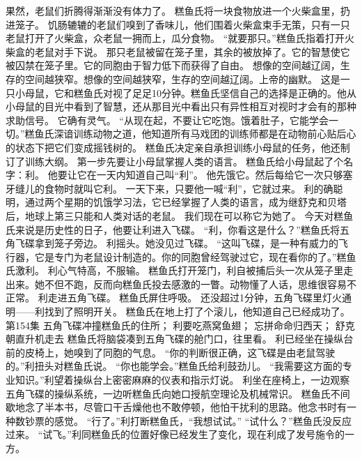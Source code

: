 \documentclass[a4paper,12pt,UTF8,twoside]{ctexbook}
\begin{document}
        果然，老鼠们折腾得渐渐没有体力了。 
        糕鱼氏将一块食物放进一个火柴盒里，扔进笼子。 
        饥肠辘辘的老鼠们嗅到了香味儿，他们围着火柴盒束手无策，只有一只老鼠打开了火柴盒，众老鼠一拥而上，瓜分食物。 
        “就要那只。”糕鱼氏指着打开火柴盒的老鼠对手下说。 
        那只老鼠被留在笼子里，其余的被放掉了。它的智慧使它被囚禁在笼子里。它的同胞由于智力低下而获得了自由。 
        想像的空间越辽阔，生存的空间越狭窄。想像的空间越狭窄，生存的空间越辽阔。上帝的幽默。 
        这是一只小母鼠，它和糕鱼氏对视了足足10分钟。糕鱼氏坚信自己的选择是正确的。他从小母鼠的目光中看到了智慧，还从那目光中看出只有异性相互对视时才会有的那种求助信号。 
        它确有灵气。 
        “从现在起，不要让它吃饱。饿着肚子，它能学会一切。”糕鱼氏深谙训练动物之道，他知道所有马戏团的训练师都是在动物前心贴后心的状态下把它们变成摇钱树的。 
        糕鱼氏决定亲自承担训练小母鼠的任务，他还制订了训练大纲。 
        第一步先要让小母鼠掌握人类的语言。 
        糕鱼氏给小母鼠起了个名字：利。 
        他要让它在一天内知道自己叫“利”。 
        他先饿它。然后每给它一次只够塞牙缝儿的食物时就叫它利。 
        一天下来，只要他一喊“利”，它就过来。 
        利的确聪明，通过两个星期的饥饿学习法，它已经掌握了人类的语言，成为继舒克和贝塔后，地球上第三只能和人类对话的老鼠。 
        我们现在可以称它为她了。 
        今天对糕鱼氏来说是历史性的日子，他要让利进入飞碟。 
        “利，你看这是什么？”糕鱼氏将五角飞碟拿到笼子旁边。 
        利摇头。她没见过飞碟。 
        “这叫飞碟，是一种有威力的飞行器，它是专门为老鼠设计制造的。你的同胞曾经驾驶过它，现在看你的了。”糕鱼氏激利。 
        利心气特高，不服输。 
        糕鱼氏打开笼门，利自被捕后头一次从笼子里走出来。她不但不跑，反而向糕鱼氏投去感激的一瞥。动物懂了人话，思维很容易不正常。 
        利走进五角飞碟。 
        糕鱼氏屏住呼吸。 
        还没超过1分钟，五角飞碟里灯火通明——利找到了照明开关。 
        糕鱼氏在地上打了个滚儿，他知道自己已经成功了。   第154集 
        五角飞碟冲撞糕鱼氏的住所； 
        利要吃燕窝鱼翅； 
        忘拼命命归西天； 
        舒克朝直升机走去   
        糕鱼氏将脑袋凑到五角飞碟的舱门口，往里看。 
        利已经坐在操纵台前的皮椅上，她嗅到了同胞的气息。 
        “你的判断很正确，这飞碟是由老鼠驾驶的。”利扭头对糕鱼氏说。 
        “你也能学会。”糕鱼氏给利鼓劲儿。 
        “我需要这方面的专业知识。”利望着操纵台上密密麻麻的仪表和指示灯说。 
        利坐在座椅上，一边观察五角飞碟的操纵系统，一边听糕鱼氏向她口授航空理论及机械常识。 
        糕鱼氏不间歇地念了半本书，尽管口干舌燥他也不敢停顿，他怕干扰利的思路。他念书时有一种数钞票的感觉。 
        “行了。”利打断糕鱼氏，“我想试试。” 
        “试什么？”糕鱼氏没反应过来。 
        “试飞。”利同糕鱼氏的位置好像已经发生了变化，现在利成了发号施令的一方。 
\end{document}
